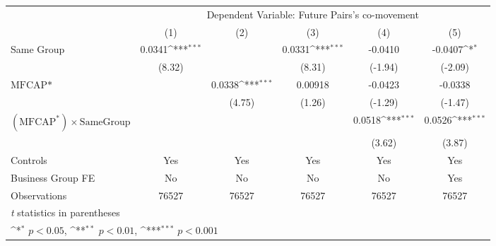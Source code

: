 {
\def\sym#1{\ifmmode^{#1}\else\(^{#1}\)\fi}
\begin{tabular}{l*{5}{c}}
\hline\hline
                &\multicolumn{5}{c}{Dependent Variable:  Future Pairs's co-movement}                           \\\cmidrule(lr){2-6}
                &\multicolumn{1}{c}{(1)}         &\multicolumn{1}{c}{(2)}         &\multicolumn{1}{c}{(3)}         &\multicolumn{1}{c}{(4)}         &\multicolumn{1}{c}{(5)}         \\
\hline
Same Group      &   0.0341\sym{***}&                  &   0.0331\sym{***}&  -0.0410         &  -0.0407\sym{*}  \\
                &   (8.32)         &                  &   (8.31)         &  (-1.94)         &  (-2.09)         \\
[1em]
$ \text{MFCAP*} $&                  &   0.0338\sym{***}&  0.00918         &  -0.0423         &  -0.0338         \\
                &                  &   (4.75)         &   (1.26)         &  (-1.29)         &  (-1.47)         \\
[1em]
 $ (\text{MFCAP}^*) \times {\text{SameGroup} }  $ &                  &                  &                  &   0.0518\sym{***}&   0.0526\sym{***}\\
                &                  &                  &                  &   (3.62)         &   (3.87)         \\
\hline
Controls        &      Yes         &      Yes         &      Yes         &      Yes         &      Yes         \\
Business Group FE&       No         &       No         &       No         &       No         &      Yes         \\
Observations    &    76527         &    76527         &    76527         &    76527         &    76527         \\
\hline\hline
\multicolumn{6}{l}{\footnotesize \textit{t} statistics in parentheses}\\
\multicolumn{6}{l}{\footnotesize \sym{*} \(p<0.05\), \sym{**} \(p<0.01\), \sym{***} \(p<0.001\)}\\
\end{tabular}
}
